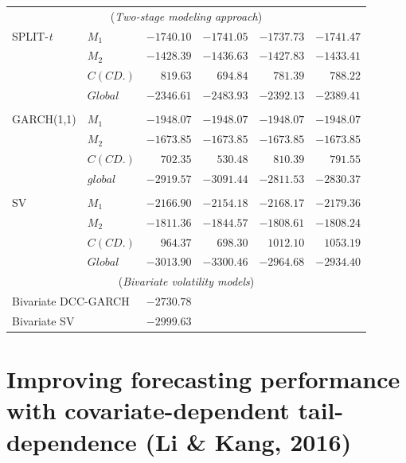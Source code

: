 \documentclass[10pt,aspectratio=169]{beamer}
\begin{document}
\begin{frame}
\begin{table}
\begin{center}
{\begin{tabular}{llrrrr}
      \multicolumn{6}{c}{(\emph{Two-stage modeling approach})}\\

      SPLIT-\emph{t}&$M_1$&$-1740.10$&$-1741.05$&$-1737.73$&$-1741.47$\\
      &$M_2$&$-1428.39$&$-1436.63$&$-1427.83$&$-1433.41$\\
      &$C(CD.)$&$819.63$&$694.84$&$781.39$&$788.22$\\
      &$Global$&${-2346.61}$&$-2483.93$&$-2392.13$&$-2389.41$\\

      \\
      GARCH(1,1)&$M_1$&$-1948.07$&$-1948.07$&$-1948.07$&$-1948.07$\\
      &$M_2$&$-1673.85$&$-1673.85$&$-1673.85$&$-1673.85$\\
      &$C(CD.)$&$702.35$&$530.48$&$810.39$&$791.55$\\
      &$global$&$-2919.57$&$$-3091.44$$&$-2811.53$&$-2830.37$\\
      \\
      SV&$M_1$&$-2166.90$&$-2154.18$&$-2168.17$&$-2179.36$\\
      &$M_2$&$-1811.36$&$-1844.57$&$-1808.61$&$-1808.24$\\
      &$C(CD.)$&$964.37$&$698.30$&$1012.10$&$1053.19$\\
      &$Global$&$-3013.90$&$-3300.46$&$-2964.68$&$-2934.40$\\

      \midrule
      \multicolumn{6}{c}{(\emph{Bivariate volatility models})}\\

      \multicolumn{2}{l}{Bivariate DCC-GARCH}&$-2730.78$&\\
      \multicolumn{2}{l}{Bivariate SV}&$-2999.63$&\\
      \bottomrule
    \end{tabular}
     }
  \end{center}

\end{table}

\end{frame}

\section{Improving forecasting performance with covariate-dependent tail-dependence (Li \&
  Kang, 2016)}
\end{document}
